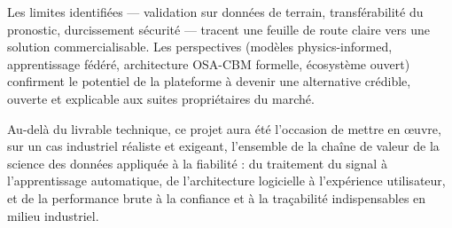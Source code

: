 Les limites identifiées --- validation sur données de terrain, transférabilité du pronostic,
durcissement sécurité --- tracent une feuille de route claire vers une solution
commercialisable. Les perspectives (modèles physics-informed, apprentissage fédéré,
architecture OSA-CBM formelle, écosystème ouvert) confirment le potentiel de la plateforme à
devenir une alternative crédible, ouverte et explicable aux suites propriétaires du marché.

Au-delà du livrable technique, ce projet aura été l'occasion de mettre en œuvre, sur un cas
industriel réaliste et exigeant, l'ensemble de la chaîne de valeur de la science des données
appliquée à la fiabilité : du traitement du signal à l'apprentissage automatique, de
l'architecture logicielle à l'expérience utilisateur, et de la performance brute à la
confiance et à la traçabilité indispensables en milieu industriel.
